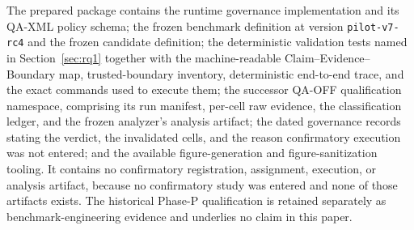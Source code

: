 \documentclass[acmsmall,screen,review,anonymous]{acmart}
\begin{document}
The prepared package contains the runtime governance implementation and its
QA-XML policy schema; the frozen benchmark definition at version
\texttt{pilot-v7-rc4} and the frozen candidate definition; the deterministic
validation tests named in Section~\ref{sec:rq1} together with the
machine-readable Claim--Evidence--Boundary map, trusted-boundary inventory,
deterministic end-to-end trace, and the exact commands used to execute them;
the successor QA-OFF qualification namespace, comprising its run manifest,
per-cell raw evidence, the classification ledger, and the frozen analyzer's
analysis artifact; the dated governance records stating the verdict, the
invalidated cells, and the reason confirmatory execution was not entered; and the
available figure-generation and figure-sanitization tooling. It contains no
confirmatory registration, assignment,
execution, or analysis artifact, because no confirmatory study was entered and
none of those artifacts exists. The historical Phase-P qualification is retained
separately as benchmark-engineering evidence and underlies no claim in this
paper.

\label{pg:refsstart}



\label{pg:end}
\end{document}

